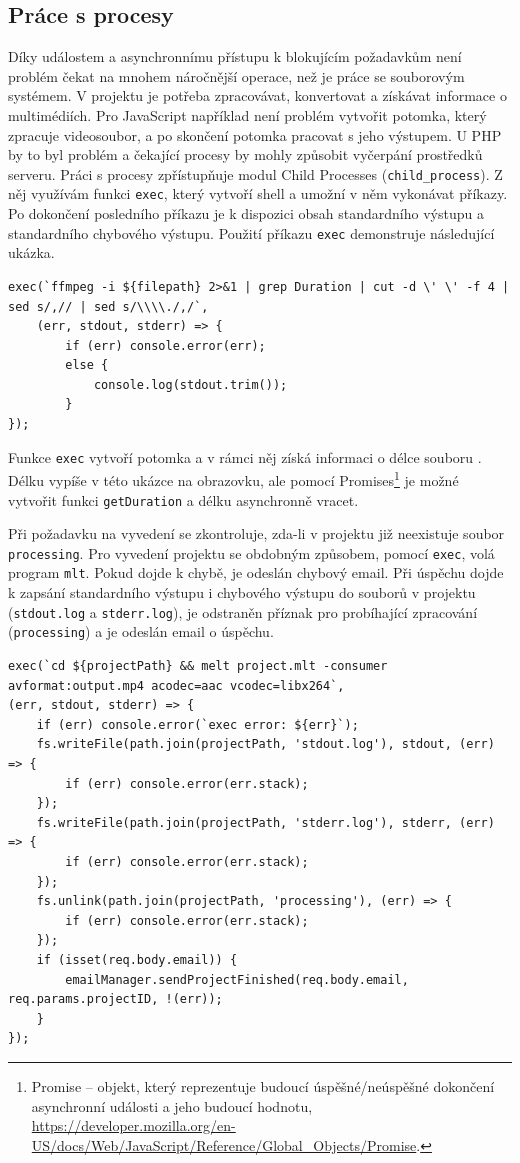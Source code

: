 \subsection{Práce s procesy}\label{ch:Práce s procesy}
Díky událostem a asynchronnímu přístupu k blokujícím požadavkům není problém čekat na mnohem náročnější operace, než je práce se souborovým systémem. V projektu je potřeba zpracovávat, konvertovat a získávat informace o multimédiích. Pro JavaScript například není problém vytvořit potomka, který zpracuje videosoubor, a po skončení potomka pracovat s jeho výstupem. U PHP by to byl problém a čekající procesy by mohly způsobit vyčerpání prostředků serveru. Práci s procesy zpřístupňuje modul Child Processes (\texttt{child\_process}). Z něj využívám funkci \texttt{exec}, který vytvoří shell a umožní v něm vykonávat příkazy. Po dokončení posledního příkazu je k dispozici obsah standardního výstupu a standardního chybového výstupu. Použití příkazu \texttt{exec} demonstruje následující ukázka.
\begin{lstlisting}[style=JavaScript]
exec(`ffmpeg -i ${filepath} 2>&1 | grep Duration | cut -d \' \' -f 4 | sed s/,// | sed s/\\\\./,/`,
    (err, stdout, stderr) => {
        if (err) console.error(err);
        else {
            console.log(stdout.trim());
        }
});
\end{lstlisting}
Funkce \texttt{exec} vytvoří potomka a v rámci něj získá informaci o délce souboru . Délku vypíše v této ukázce na obrazovku, ale pomocí Promises\footnote{Promise -- objekt, který reprezentuje budoucí úspěšné/neúspěšné dokončení asynchronní události a jeho budoucí hodnotu, \url{https://developer.mozilla.org/en-US/docs/Web/JavaScript/Reference/Global_Objects/Promise}.} je možné vytvořit funkci \texttt{getDuration} a délku asynchronně vracet.

Při požadavku na vyvedení se zkontroluje, zda-li v projektu již neexistuje soubor \texttt{processing}. Pro vyvedení projektu se obdobným způsobem, pomocí \texttt{exec}, volá program \texttt{mlt}. Pokud dojde k chybě, je odeslán chybový email. Při úspěchu dojde k zapsání standardního výstupu i chybového výstupu do souborů v projektu (\texttt{stdout.log} a \texttt{stderr.log}), je odstraněn příznak pro probíhající zpracování (\texttt{processing}) a je odeslán email o úspěchu.
\begin{lstlisting}[style=JavaScript]
exec(`cd ${projectPath} && melt project.mlt -consumer avformat:output.mp4 acodec=aac vcodec=libx264`,
(err, stdout, stderr) => {
    if (err) console.error(`exec error: ${err}`);
    fs.writeFile(path.join(projectPath, 'stdout.log'), stdout, (err) => {
        if (err) console.error(err.stack);
    });
    fs.writeFile(path.join(projectPath, 'stderr.log'), stderr, (err) => {
        if (err) console.error(err.stack);
    });
    fs.unlink(path.join(projectPath, 'processing'), (err) => {
        if (err) console.error(err.stack);
    });
    if (isset(req.body.email)) {
        emailManager.sendProjectFinished(req.body.email, req.params.projectID, !(err));
    }
});
\end{lstlisting}\textbf{}

